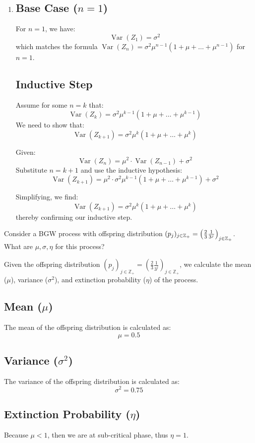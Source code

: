 \begin{solution}
\begin{enumerate}
		\item
		
		
		\subsection*{Base Case (\(n=1\))}
		For \(n=1\), we have:
		\[
		\operatorname{Var}(Z_1) = \sigma^2
		\]
		which matches the formula \(\operatorname{Var}(Z_n) = \sigma^2\mu^{n-1}(1+\mu + \dots + \mu^{n-1})\) for \(n=1\).
		
		\subsection*{Inductive Step}
		Assume for some \(n = k\) that:
		\[
		\operatorname{Var}(Z_k) = \sigma^2\mu^{k-1}(1+\mu + \dots + \mu^{k-1})
		\]
		We need to show that:
		\[
		\operatorname{Var}(Z_{k+1}) = \sigma^2\mu^k(1+\mu + \dots + \mu^k)
		\]
		
		Given:
		\[
		\operatorname{Var}(Z_{n}) = \mu^2 \cdot \operatorname{Var}(Z_{n-1}) + \sigma^2
		\]
		Substitute \(n=k+1\) and use the inductive hypothesis:
		\[
		\operatorname{Var}(Z_{k+1}) = \mu^2 \cdot \sigma^2\mu^{k-1}(1+\mu + \dots + \mu^{k-1}) + \sigma^2
		\]
		
		Simplifying, we find:
		\[
		\operatorname{Var}(Z_{k+1}) = \sigma^2\mu^k(1+\mu + \dots + \mu^k)
		\]
		thereby confirming our inductive step.
	\end{enumerate}
	
\end{solution}

\begin{problem}
	Consider a BGW process with offspring distribution $(p_j)_{j\in\mathbb{Z}_+} = \left(\frac{2}{3}\frac{1}{3^j}\right)_{j\in\mathbb{Z}_+}$. What are $\mu, \sigma, \eta$ for this process?
\end{problem}

\begin{solution}
	Given the offspring distribution \((p_j)_{j\in\mathbb{Z}_+} = \left(\frac{2}{3}\frac{1}{3^j}\right)_{j\in\mathbb{Z}_+}\), we calculate the mean (\(\mu\)), variance (\(\sigma^2\)), and extinction probability (\(\eta\)) of the process.
	
	\subsection*{Mean (\(\mu\))}
	The mean of the offspring distribution is calculated as:
	\[
	\mu = 0.5
	\]
	
	\subsection*{Variance (\(\sigma^2\))}
	The variance of the offspring distribution is calculated as:
	\[
	\sigma^2 = 0.75
	\]
	
	\subsection*{Extinction Probability (\(\eta\))}
	Because $ \mu < 1 $, then we are at sub-critical phase, thus $ \eta = 1 $.
\end{solution}


